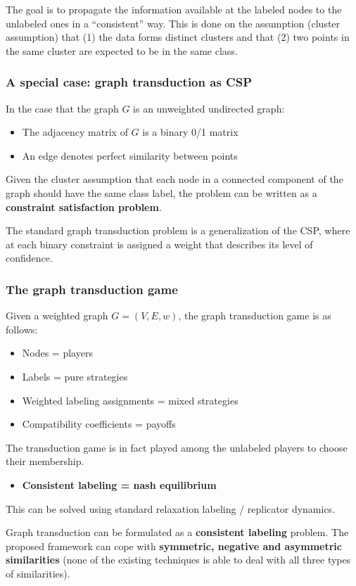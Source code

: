 The goal is to propagate the information available at the labeled nodes to the
unlabeled ones in a ``consistent'' way. This is done on the assumption (cluster
assumption) that (1) the data forms distinct clusters and that (2)  two points in the
same cluster are expected to be in the same class.

\subsubsection{A special case: graph transduction as CSP}
In the case that the graph $G$ is an unweighted undirected graph:
\begin{itemize}
\item The adjacency matrix of $G$ is a binary 0/1 matrix
\item An edge denotes perfect similarity between points
\end{itemize}
Given the cluster assumption that each node in a connected component of the graph
should have the same class label, the problem can be written as a \textbf{constraint
  satisfaction problem}.

The standard graph transduction problem is a generalization of the CSP, where at each
binary constraint is assigned a weight that describes its level of confidence.

\subsubsection{The graph transduction game}
Given a weighted graph $G = (V, E, w)$, the graph transduction game is as follows:
\begin{itemize}
\item Nodes = players
\item Labels = pure strategies
\item Weighted labeling assignments = mixed strategies
\item Compatibility coefficients = payoffs
\end{itemize}
The transduction game is in fact played among the unlabeled players to choose their
membership.
\begin{itemize}
\item \textbf{Consistent labeling = nash equilibrium}
\end{itemize}
This can be solved using standard relaxation labeling / replicator dynamics.

Graph transduction can be formulated as a \textbf{consistent labeling} problem. The
proposed framework can cope with \textbf{symmetric, negative and asymmetric
  similarities} (none of the existing techniques is able to deal with all three types
of similarities).
